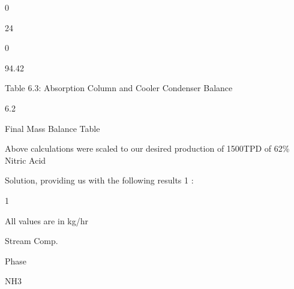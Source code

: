 \documentclass[a4paper,portrait,12pt]{article}
\begin{document}
0





24





0





94.42





\begin{flushleft}
Table 6.3: Absorption Column and Cooler Condenser Balance
\end{flushleft}





6.2





\begin{flushleft}
Final Mass Balance Table
\end{flushleft}





\begin{flushleft}
Above calculations were scaled to our desired production of 1500TPD of 62\% Nitric Acid
\end{flushleft}


\begin{flushleft}
Solution, providing us with the following results 1 :
\end{flushleft}


1





\begin{flushleft}
All values are in kg/hr
\end{flushleft}





\begin{flushleft}
\newpage
Stream Comp.
\end{flushleft}





\begin{flushleft}
Phase
\end{flushleft}





\begin{flushleft}
NH3
\end{flushleft}
\end{document}

